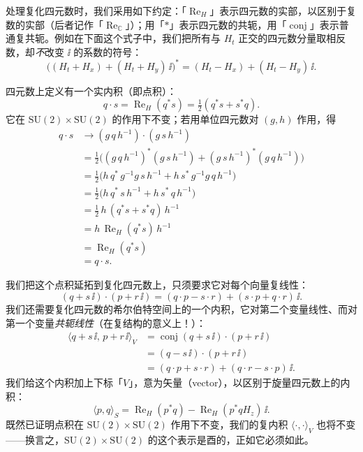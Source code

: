 处理复化四元数时，我们采用如下约定：「$\operatorname{Re}_H$」表示四元数的实部，以区别于复数的实部（后者记作「$\operatorname{Re}_{\mathbb{C}}$」）；用「$*$」表示四元数的共轭，用「$\operatorname{conj}$」表示普通复共轭。例如在下面这个式子中，我们把所有与 $H_t$ 正交的四元数分量取相反数，却\emph{不}改变 $\ii$ 的系数的符号：
\begin{equation*}
\bigl((H_t+H_x)+(H_t+H_y)\,\ii\bigr)^*=(H_t-H_x)+(H_t-H_y)\,\ii .
\end{equation*}

四元数上定义有一个实内积（即点积）：
\begin{equation*}
q\cdot s=\operatorname{Re}_H(q^*s)=\tfrac12(q^*s+s^*q).
\end{equation*}
它在 $\mathrm{SU}(2)\times\mathrm{SU}(2)$ 的作用下不变；若用单位四元数对 $(g,h)$ 作用，得
\begin{align*}
q\cdot s &\to (g\,q\,h^{-1})\cdot(g\,s\,h^{-1})\\
&= \tfrac12\bigl((g\,q\,h^{-1})^*(g\,s\,h^{-1})+(g\,s\,h^{-1})^*(g\,q\,h^{-1})\bigr)\\
&= \tfrac12\bigl(h\,q^*\,g^{-1}g\,s\,h^{-1}+h\,s^*\,g^{-1}g\,q\,h^{-1}\bigr)\\
&= \tfrac12\bigl(h\,q^*\,s\,h^{-1}+h\,s^*\,q\,h^{-1}\bigr)\\
&= \tfrac12\,h\,(q^*s+s^*q)\,h^{-1}\\
&= h\,\operatorname{Re}_H(q^*s)\,h^{-1}\\
&= \operatorname{Re}_H(q^*s)\\
&= q\cdot s .
\end{align*}

我们把这个点积延拓到复化四元数上，只须要求它对每个向量复线性：
\begin{equation*}
(q+s\,\ii)\cdot(p+r\,\ii)=(q\cdot p-s\cdot r)+(s\cdot p+q\cdot r)\,\ii .
\end{equation*}
我们还需要复化四元数的希尔伯特空间上的一个内积，它对第二个变量线性、而对第一个变量\emph{共轭线性}（在复结构的意义上！）：
\begin{align*}
\langle q+s\,\ii,\,p+r\,\ii\rangle_V
&= \operatorname{conj}(q+s\,\ii)\cdot(p+r\,\ii)\\
&= (q-s\,\ii)\cdot(p+r\,\ii)\\
&= (q\cdot p+s\cdot r)+(q\cdot r-s\cdot p)\,\ii .
\end{align*}
我们给这个内积加上下标「$V$」，意为矢量（vector），以区别于旋量四元数上的内积：
\begin{equation*}
\langle p,q\rangle_S=\operatorname{Re}_H(p^*q)-\operatorname{Re}_H(p^*qH_z)\,\ii .
\end{equation*}
既然已证明点积在 $\mathrm{SU}(2)\times\mathrm{SU}(2)$ 作用下不变，我们的复内积 $\langle\cdot,\cdot\rangle_V$ 也将不变——换言之，$\mathrm{SU}(2)\times\mathrm{SU}(2)$ 的这个表示是酉的，正如它必须如此。

